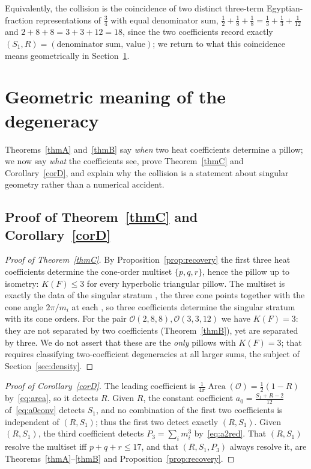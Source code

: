 \documentclass[12pt, letterpaper]{article}
\theoremstyle{definition}
\theoremstyle{plain}
\begin{document}
Equivalently, the collision is the coincidence of two distinct three-term Egyptian-fraction representations of $\tfrac34$ with equal denominator sum, $\tfrac12+\tfrac18+\tfrac18=\tfrac13+\tfrac13+\tfrac1{12}$ and $2+8+8=3+3+12=18$, since the two coefficients record exactly $(S_1,R)=(\text{denominator sum, value})$; we return to what this coincidence means geometrically in Section~\ref{sec:geometry}.

\newpage
\section{Geometric meaning of the degeneracy}
\label{sec:geometry}

Theorems~\ref{thmA} and~\ref{thmB} say \emph{when} two heat coefficients determine a pillow; we now say \emph{what} the coefficients see, prove Theorem~\ref{thmC} and Corollary~\ref{corD}, and explain why the collision is a statement about singular geometry rather than a numerical accident.

\subsection{Proof of Theorem~\ref{thmC} and Corollary~\ref{corD}}

\begin{proof}[Proof of Theorem~\ref{thmC}]
By Proposition~\ref{prop:recovery} the first three heat coefficients determine the cone-order multiset $\{p,q,r\}$, hence the pillow up to isometry: $K(F)\le3$ for every hyperbolic triangular pillow. The multiset is exactly the data of the singular stratum ,  the three cone points together with the cone angle $2\pi/m_i$ at each ,  so three coefficients determine the singular stratum with its cone orders. For the pair $\mathcal{O}(2,8,8),\mathcal{O}(3,3,12)$ we have $K(F)=3$: they are not separated by two coefficients (Theorem~\ref{thmB}), yet are separated by three. We do not assert that these are the \emph{only} pillows with $K(F)=3$; that requires classifying two-coefficient degeneracies at all larger sums, the subject of Section~\ref{sec:density}.
\end{proof}

\begin{proof}[Proof of Corollary~\ref{corD}]
The leading coefficient is $\tfrac{1}{4\pi}\operatorname{Area}(\mathcal{O})=\tfrac12(1-R)$ by~\eqref{eq:area}, so it detects $R$. Given $R$, the constant coefficient $a_0=\tfrac{S_1+R-2}{12}$ of~\eqref{eq:a0conv} detects $S_1$, and no combination of the first two coefficients is independent of $(R,S_1)$; thus the first two detect exactly $(R,S_1)$. Given $(R,S_1)$, the third coefficient detects $P_3=\sum_i m_i^3$ by~\eqref{eq:a2red}. That $(R,S_1)$ resolve the multiset iff $p+q+r\le17$, and that $(R,S_1,P_3)$ always resolve it, are Theorems~\ref{thmA}--\ref{thmB} and Proposition~\ref{prop:recovery}.
\end{proof}
\end{document}
